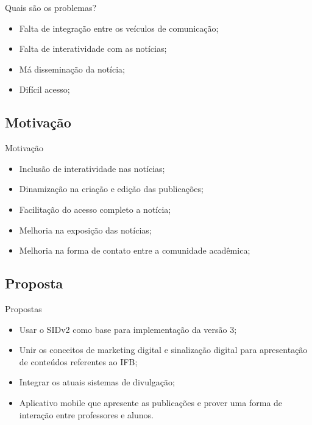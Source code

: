 \documentclass{aula-ifb}
\begin{document}
\begin{frame}{Quais são os problemas?}
\begin{itemize}
   \item Falta de integração entre os veículos de comunicação;
   \vspace{10px}
   \item Falta de interatividade com as notícias;
   \vspace{10px}
   \item Má disseminação da notícia;
   \vspace{10px}
   \item Difícil acesso;
\end{itemize}	 
\end{frame}

\subsection{Motivação}
\begin{frame}{Motivação}
	\begin{itemize}
		\item Inclusão de interatividade nas notícias;
		\vspace{10px}		
		\item Dinamização na criação e edição das publicações;
		\vspace{10px}		
		\item Facilitação do acesso completo a notícia;
		\vspace{10px}
		\item Melhoria na exposição das notícias;
		\vspace{10px}
		\item Melhoria na forma de contato entre a comunidade acadêmica;
	\end{itemize}
\end{frame}

\subsection{Proposta}
\begin{frame}{Propostas}
	\begin{itemize}
		\item Usar o SIDv2 como base para implementação da versão 3;
		\vspace{10px}
		\item Unir os conceitos de marketing digital e sinalização digital para apresentação de conteúdos referentes ao IFB;
		\vspace{10px}
		\item Integrar os atuais sistemas de divulgação;
		\vspace{10px}
		\item Aplicativo mobile que apresente as publicações e prover uma forma de interação entre professores e alunos.
	\end{itemize}
\end{frame}
\end{document}
